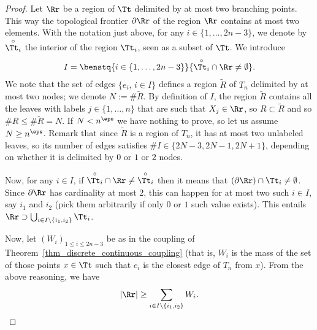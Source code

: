 \begin{proof}
Let $\Rr$ be a region of $\Tt$ delimited by at most two branching points.
This way the topological frontier $\partial \Rr$ of the region $\Rr$ contains at most two elements.
With the notation just above, for any $i\in\{1,\dots,2n-3\}$, we denote by $\overset{\circ}{\Tt_i}$ the interior of the region $\Tt_i$, seen as a subset of $\Tt$.
We introduce
\begin{align*}
I=\benstq{i\in \{1,\dots,2n-3\}}{\overset{\circ}{\Tt_i} \cap \Rr \neq \emptyset }.
\end{align*}
We note that the set of edges $\{e_i,\, i\in I\}$ defines a region $\tilde{R}$ of $T_n$ delimited by at most two nodes; we denote $N:=\#\tilde{R}$.
By definition of $I$, the region $\tilde{R}$ contains all the leaves with labels $j \in \{1,\dots,n\}$ that are such that $X_j \in \Rr$, so $R\subset \tilde{R}$ and so $\#R\leq \#\tilde{R}=N$.
If $N<n^\eps$ we have nothing to prove, so let us assume $N \geq n^{\eps}$.
Remark that since $\tilde{R}$ is a region of $T_n$, it has at most two unlabeled leaves, so its number of edges satisfies $\#I\in \{2N-3,2N-1,2N+1\}$, depending on whether it is delimited by $0$ or $1$ or $2$ nodes.

Now, for any $i\in I$, if $\overset{\circ}{\Tt_i} \cap \Rr \neq \overset{\circ}{\Tt_i}$ then it means that $(\partial \Rr)\cap \Tt_i \neq \emptyset$.
Since $\partial \Rr$ has cardinality at most $2$, this can happen for at most two such $i\in I$, say $i_1$ and $i_2$ (pick them arbitrarily if only $0$ or $1$ such value exists).
This entails $\Rr\supset \bigcup_{i\in I \setminus \{i_1,i_2\}} \Tt_i$.

Now, let $(W_i)_{1\leq i \leq 2n-3}$ be as in the coupling of Theorem~\ref{thm_discrete_continuous_coupling} (that is, $W_i$ is the mass of the set of those points $x \in \Tt$ such that $e_i$ is the closest edge of $T_n$ from $x$).
From the above reasoning, we have
\begin{equation}\label{eqn:mass_region_and_W}
\left| \Rr \right|\geq \sum_{i \in I\setminus\{i_1,i_2\}} W_i.
\end{equation}


\end{proof}
